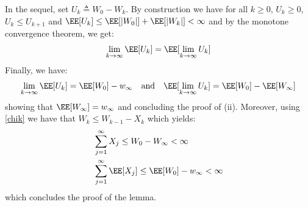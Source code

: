 \documentclass[11pt]{article}
\makeatletter
\renewenvironment{proof}[1][\proofname]{%
   \par\pushQED{\qed}\normalfont%
   \topsep6\p@\@plus6\p@\relax
   \trivlist\item[\hskip\labelsep\bfseries#1]%
   \ignorespaces
}{%
   \popQED\endtrivlist\@endpefalse
}
\theoremstyle{t}
\makeatother
\begin{document}
\begin{proof}
In the sequel, set $U_k \triangleq W_0 - W_k$. By construction we have for all $k \geq 0$, $U_k \geq 0$, $U_k \leq U_{k+1}$ and $\EE[U_k] \leq \EE[|W_0|] + \EE[|W_k|] < \infty$ and by the monotone convergence theorem, we get:
\begin{equation}
    \lim \limits_{k \to \infty} \EE[U_k] = \EE[\lim \limits_{k \to \infty}U_k]
\end{equation}
Finally, we have:
\begin{equation}
\lim \limits_{k \to \infty} \EE[U_k] = \EE[W_0] - w_{\infty} \quad \textrm{and} \quad \EE[\lim \limits_{k \to \infty}U_k] = \EE[W_0] - \EE[W_{\infty}]
\end{equation}
showing that $\EE[W_{\infty}] = w_{\infty}$ and concluding the proof of (ii). Moreover, using \eqref{chik} we have that $W_k \leq W_{k-1} - X_k$ which yields:
\begin{equation}
\begin{split}
    & \sum_{j=1}^{\infty}{X_j} \leq W_{0} - W_{\infty} < \infty\\
    & \sum_{j=1}^{\infty}{\EE[X_j]} \leq \EE[W_{0}] - w_{\infty} < \infty
\end{split}
\end{equation}
which concludes the proof of the lemma.
\end{proof}


\end{document}

